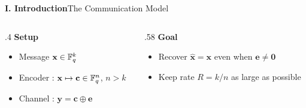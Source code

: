 \begin{frame}{\textbf{I. Introduction}}{The Communication Model}
\begin{center}
\end{center}
%
\bigskip
\begin{columns}[T,onlytextwidth]
\begin{column}{.4\textwidth}
\textbf{Setup}
\begin{itemize}\small
	\item Message $\mathbf{x}\in\mathbb{F}_q^k$
	\item Encoder : $\mathbf{x}\mapsto\mathbf{c}\in\mathbb{F}_q^n$,\; $n>k$
	\item Channel : $\mathbf{y}=\mathbf{c}\oplus\mathbf{e}$
\end{itemize}
\end{column}
\begin{column}{.58\textwidth}
\textbf{Goal}
	\begin{itemize}\small
	\item Recover $\hat{\mathbf{x}}=\mathbf{x}$ even when $\mathbf{e}\neq\mathbf{0}$
	\item Keep rate $R = k/n$ as large as possible
	\end{itemize}
\end{column}
\end{columns}
\end{frame}

